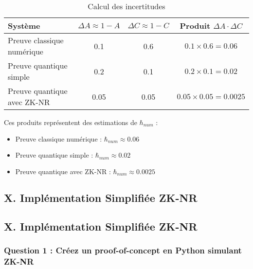 \documentclass[12pt, a4paper]{article}
\begin{document}
		\begin{table}[H]
			\centering
			\begin{tabular}{|p{5cm}|c|c|c|}
				\hline
				\textbf{Système} & \textbf{$\Delta A \approx 1 - A$} & \textbf{$\Delta C \approx 1 - C$} & \textbf{Produit $\Delta A \cdot \Delta C$} \\
				\hline
				Preuve classique numérique & 0.1 & 0.6 & $0.1 \times 0.6 = 0.06$ \\
				\hline
				Preuve quantique simple & 0.2 & 0.1 & $0.2 \times 0.1 = 0.02$ \\
				\hline
				Preuve quantique avec ZK-NR & 0.05 & 0.05 & $0.05 \times 0.05 = 0.0025$ \\
				\hline
			\end{tabular}
			\caption{Calcul des incertitudes}
		\end{table}
		
		Ces produits représentent des estimations de $\hbar_{num}$ :
		\begin{itemize}
			\item Preuve classique numérique : $\hbar_{num} \approx 0.06$
			\item Preuve quantique simple : $\hbar_{num} \approx 0.02$
			\item Preuve quantique avec ZK-NR : $\hbar_{num} \approx 0.0025$
		\end{itemize}
		
		\subsection*{X. Implémentation Simplifiée ZK-NR}
		
		\subsection*{X. Implémentation Simplifiée ZK-NR}
		
		\subsubsection*{Question 1 : Créez un proof-of-concept en Python simulant ZK-NR}
		
\end{document}
